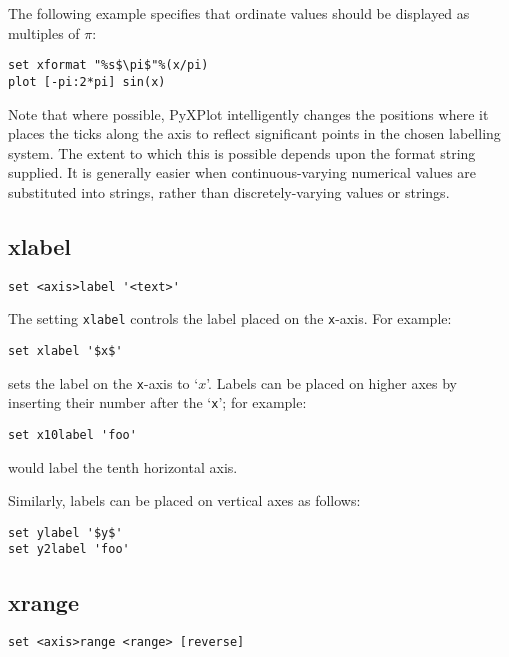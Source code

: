 The following example specifies that ordinate values should be displayed as
multiples of $\pi$:
\begin{verbatim}
set xformat "%s$\pi$"%(x/pi)
plot [-pi:2*pi] sin(x)
\end{verbatim}

Note that where possible, PyXPlot intelligently changes the positions where it
places the ticks along the axis to reflect significant points in the chosen
labelling system.  The extent to which this is possible depends upon the format
string supplied. It is generally easier when continuous-varying numerical
values are substituted into strings, rather than discretely-varying values or
strings.

\subsection{xlabel}

\begin{verbatim}
set <axis>label '<text>'
\end{verbatim}

The setting {\tt xlabel} controls the label placed on the {\tt x}-axis.
For example:

\begin{verbatim}
set xlabel '$x$'
\end{verbatim}

\noindent sets the label on the {\tt x}-axis to `$x$'.  Labels can be placed on
higher axes by inserting their number after the `{\tt x}'; for example:

\begin{verbatim}
set x10label 'foo'
\end{verbatim}

\noindent would label the tenth horizontal axis.

Similarly, labels can be placed on vertical axes as follows:

\begin{verbatim}
set ylabel '$y$'
set y2label 'foo'
\end{verbatim}


\subsection{xrange}

\begin{verbatim}
set <axis>range <range> [reverse]
\end{verbatim}

